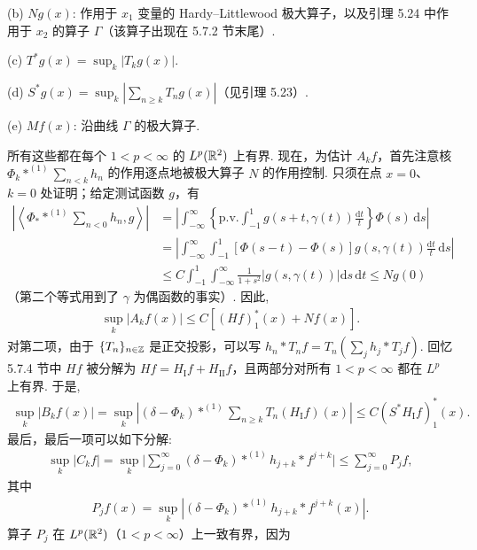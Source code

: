 (b) $Ng(x)$: 作用于 $x_1$ 变量的 Hardy--Littlewood 极大算子，以及引理 5.24 中作用于 $x_2$ 的算子 $\Gamma$（该算子出现在 5.7.2 节末尾）.

(c) $T^*g(x) = \sup_k |T_k g(x)|$.

(d) $S^* g(x) = \sup_k |\sum_{n \geq k} T_n g(x)|$（见引理 5.23）.

(e) $Mf(x)$: 沿曲线 $\Gamma$ 的极大算子.

所有这些都在每个 $1 < p < \infty$ 的 $L^p(\mathbb{R}^2)$ 上有界. 现在，为估计 $A_k f$，首先注意核 $\Phi_k *^{(1)} \sum_{n<k} h_n$ 的作用逐点地被极大算子 $N$ 的作用控制. 只须在点 $x = 0$、$k = 0$ 处证明；给定测试函数 $g$，有
\begin{align*}
  \left|\left\langle\Phi_{*}*^{(1)}\sum_{n<0}h_{n},g\right\rangle\right|
  &=\left|\int_{-\infty}^{\infty}\left\{\mathrm{p.v.}\int_{-1}^{1}g\left(s+t,\gamma(t)\right)\frac{\mathrm{d}t}{t}\right\}\Phi(s)\,\mathrm{d}s\right|\\
  &=\left|\int_{-\infty}^{\infty}\int_{-1}^{1}\left[\Phi(s-t)-\Phi(s)\right]g\left(s,\gamma(t)\right)\frac{\mathrm{d}t}{t}\,\mathrm{d}s\right|\\
  &\leq C\int_{-1}^{1}\int_{-\infty}^{\infty}\frac{1}{1+s^{2}}\left|g\left(s,\gamma(t)\right)\right|\mathrm{d}s\,\mathrm{d}t
  \leq Ng(0)
\end{align*}
（第二个等式用到了 $\gamma$ 为偶函数的事实）. 因此,
\begin{align*}
  \sup_{k}\left|A_{k}f(x)\right|\leq C\left[(H f)_{1}^{*}(x)+N f(x)\right].
\end{align*}
对第二项，由于 $\{T_n\}_{n\in\mathbb{Z}}$ 是正交投影，可以写 $h_n*T_nf = T_n(\sum_j h_j*T_j f)$. 回忆 5.7.4 节中 $Hf$ 被分解为 $Hf = H_{\mathrm{I}}f + H_{\mathrm{II}}f$，且两部分对所有 $1 < p < \infty$ 都在 $L^p$ 上有界. 于是,
\begin{align*}
  \sup_{k}\left|B_{k}f(x)\right|
  =\sup_{k}\left|\left(\delta-\Phi_{k}\right)*^{(1)}\sum_{n\geq k}T_{n}(H_{\mathrm{I}}f)(x)\right|
  \leq C\left(S^{*}H_{\mathrm{I}}f\right)_{1}^{*}(x).
\end{align*}
最后，最后一项可以如下分解:
\begin{align*}
  \sup_{k}\left|C_{k}f\right|
  =\sup_{k}\Big|\sum_{j=0}^{\infty}\left(\delta-\Phi_{k}\right)*^{(1)}h_{j+k}*f^{j+k}\Big|
  \leq\sum_{j=0}^{\infty}P_{j}f,
\end{align*}
其中
\begin{align*}
  P_{j}f(x)=\sup_{k}\left|\left(\delta-\Phi_{k}\right)*^{(1)}h_{j+k}*f^{j+k}(x)\right|.
\end{align*}
算子 $P_j$ 在 $L^p(\mathbb{R}^2)$（$1 < p < \infty$）上一致有界，因为
